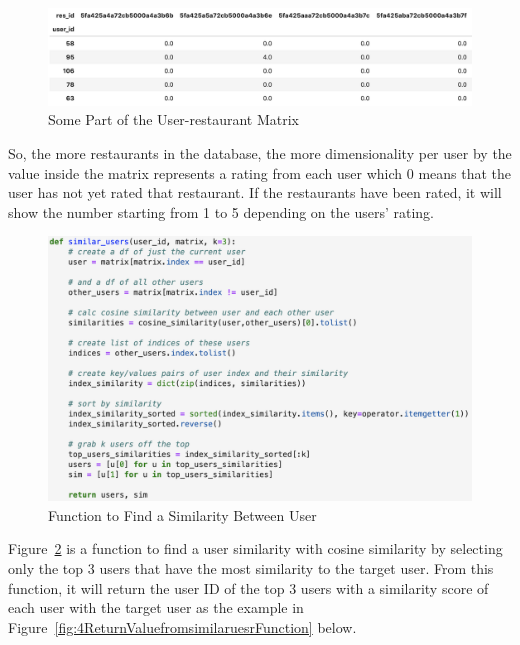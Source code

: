 \documentclass[12pt,oneside,openright,a4paper]{cpe-english-project}
\begin{document}
\begin{figure}[H]\centering
\includegraphics[width=350pt]{./images/4SomePartoftheUserrestaurantMatrix.png}
\caption{Some Part of the User-restaurant Matrix}\label{fig:4SomePartoftheUserrestaurantMatrix}
\end{figure}\vspace{-24pt}

So, the more restaurants in the database, the more dimensionality per user by the value inside the matrix represents a rating from each user which 0 means that the user has not yet rated that restaurant. If the restaurants have been rated, it will show the number starting from 1 to 5 depending on the users’ rating.

\begin{figure}[H]\centering
\includegraphics[width=350pt]{./images/4FunctiontoFindaSimilarityBetweenUser.png}
\caption{Function to Find a Similarity Between User}\label{fig:4FunctiontoFindaSimilarityBetweenUser}
\end{figure}\vspace{-24pt}

Figure~\ref{fig:4FunctiontoFindaSimilarityBetweenUser} is a function to find a user similarity with cosine similarity by selecting only the top 3 users that have the most similarity to the target user. From this function, it will return the user ID of the top 3 users with a similarity score of each user with the target user as the example in Figure~\ref{fig:4ReturnValuefromsimilaruesrFunction} below.
\end{document}

